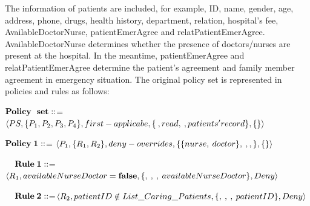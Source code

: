 



The information of patients are included, for example, ID, name, gender, age, address, phone, drugs, health history, department, relation, hospital's fee, AvailableDoctorNurse, %
patientEmerAgree and relatPatientEmerAgree. %
AvailableDoctorNurse determines whether the presence of doctors/nurses are present at the hospital.
In the meantime, patientEmerAgree and relatPatientEmerAgree determine the patient's agreement and family member agreement in emergency situation.
The original policy set is represented in policies and rules as follows:

\textit{$\textbf{Policy\: set}::$}= \textit{$\langle  PS, \{P_1, P_2, P_3, P_4\}, first-applicabe, \{ \:, read, \:,\\ patients' record \}, \{ \} \rangle$}

\textit{$\textbf{Policy\:1}::$}= \textit{$\langle  P_1, \{R_1, R_2\}, deny-overrides, \{ \{ nurse,\: doctor\},\: ,\\ , \}, \{ \} \rangle$}


\textit{$\:\:\:\:\: \textbf{Rule\:1}::$}=\textit{$\langle R_1, availableNurseDoctor = \textbf{false}, \{,\: ,\: ,\: available\\NurseDoctor\}, Deny \rangle$}

\textit{$\:\:\:\:\: \textbf{Rule\:2}::$}=\textit{$\langle R_2, patientID \notin List\_Caring\_Patients, \{ ,\: ,\: ,\: patient\\ID\}, Deny \rangle$}

